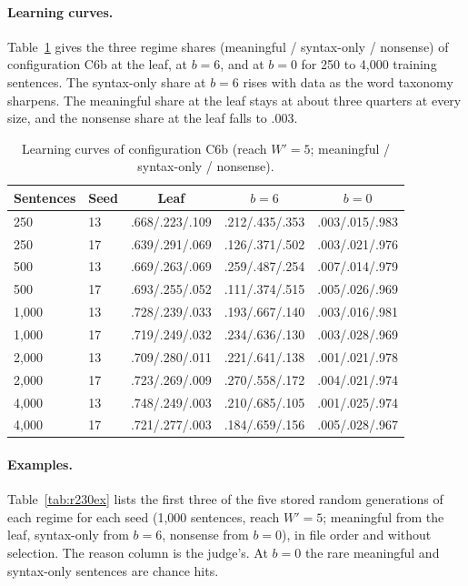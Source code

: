 \documentclass[11pt,letterpaper]{article}
\begin{document}
\paragraph{Learning curves.} Table~\ref{tab:r230curve} gives the three regime shares (meaningful / syntax-only / nonsense) of configuration C6b at the leaf, at $b=6$, and at $b=0$ for 250 to 4,000 training sentences.
The syntax-only share at $b=6$ rises with data as the word taxonomy sharpens. The meaningful share at the leaf stays at about three quarters at every size, and the nonsense share at the leaf falls to .003.

\begin{table}[h]
\caption{Learning curves of configuration C6b (reach $W'=5$; meaningful / syntax-only / nonsense).}
\label{tab:r230curve}
\begin{center}
\footnotesize
\begin{tabular}{llccc}
\toprule
Sentences & Seed & Leaf & $b=6$ & $b=0$ \\
\midrule
250 & 13 & .668/.223/.109 & .212/.435/.353 & .003/.015/.983 \\
250 & 17 & .639/.291/.069 & .126/.371/.502 & .003/.021/.976 \\
500 & 13 & .669/.263/.069 & .259/.487/.254 & .007/.014/.979 \\
500 & 17 & .693/.255/.052 & .111/.374/.515 & .005/.026/.969 \\
1,000 & 13 & .728/.239/.033 & .193/.667/.140 & .003/.016/.981 \\
1,000 & 17 & .719/.249/.032 & .234/.636/.130 & .003/.028/.969 \\
2,000 & 13 & .709/.280/.011 & .221/.641/.138 & .001/.021/.978 \\
2,000 & 17 & .723/.269/.009 & .270/.558/.172 & .004/.021/.974 \\
4,000 & 13 & .748/.249/.003 & .210/.685/.105 & .001/.025/.974 \\
4,000 & 17 & .721/.277/.003 & .184/.659/.156 & .005/.028/.967 \\
\bottomrule
\end{tabular}
\end{center}
\end{table}

\paragraph{Examples.} Table~\ref{tab:r230ex} lists the first three of the five stored random generations of each regime for each seed (1,000 sentences, reach $W'=5$; meaningful from the leaf, syntax-only from $b=6$, nonsense from $b=0$), in file order and without selection.
The reason column is the judge's. At $b=0$ the rare meaningful and syntax-only sentences are chance hits.
\end{document}
